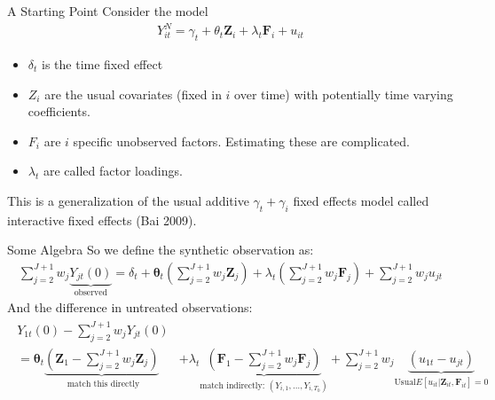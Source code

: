 \documentclass[xcolor=pdftex,dvipsnames,table,mathserif,aspectratio=169]{beamer}
\begin{document}
\begin{frame}{A Starting Point}
Consider the model
\begin{align*}
Y_{i t}^{N}=\gamma_{t}+ \theta_{t} \mathbf{Z}_{i}+\lambda_{t} \mathbf{F}_{i}+u_{i t}
\end{align*}
\begin{itemize}
\item $\delta_t$ is the time fixed effect
\item $Z_i$ are the usual covariates (fixed in $i$ over time) with potentially time varying coefficients.
\item $F_i$ are $i$ specific \alert{unobserved factors}. Estimating these are complicated.
\item $\lambda_t$ are called \alert{factor loadings}.
\end{itemize}
This is a generalization of the usual additive $\gamma_t + \gamma_i$ fixed effects model called \alert{interactive fixed effects} (Bai 2009).
\end{frame}

\begin{frame}{Some Algebra}
So we define the synthetic observation as:
\begin{align*}
\sum_{j=2}^{J+1} w_{j} \underbrace{Y_{j t}(0)}_{\text{observed}}=\delta_{t}+\boldsymbol{\theta}_{t}\left(\sum_{j=2}^{J+1} w_{j} \mathbf{Z}_{j}\right)+\lambda_{t}\left(\sum_{j=2}^{J+1} w_{j} \boldsymbol{F}_{j}\right)+\sum_{j=2}^{J+1} w_{j} u_{j t}
\end{align*}
And the difference in untreated observations:
\begin{align*}
\begin{aligned}
Y_{1 t}(0)-\sum_{j=2}^{J+1} w_{j} Y_{j t}(0)\\
=\boldsymbol{\theta}_{t} \underbrace{\left( \mathbf{Z}_{1}-\sum_{j=2}^{J+1} w_{j} \mathbf{Z}_{j} \right)}_{\text{ match this directly}} 
&+\lambda_{t} \underbrace{\left(\boldsymbol{F}_{1}-\sum_{j=2}^{J+1} w_{j} \boldsymbol{F}_{j}\right)}_{\text{match indirectly:  }  (Y_{i,1},\ldots,Y_{i,T_0})}+\sum_{j=2}^{J+1} w_{j}\underbrace{\left(u_{1 t}-u_{j t}\right)}_{\text{Usual} E[u_{it} | \mathbf{Z}_{it}, \mathbf{F}_{it} ]=0}
\end{aligned}
\end{align*}
\end{frame}
\end{document}
